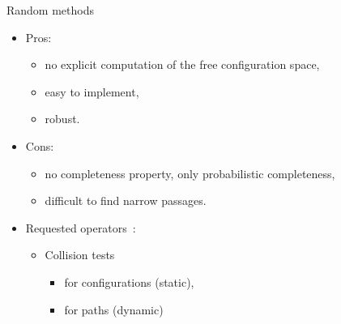 %
%

\begin{frame} {Random methods}
  \begin{itemize}
  \item Pros:
    \begin{itemize}
    \item no explicit computation of the free configuration space,
    \item easy to implement,
    \item robust.
    \end{itemize}
    \pause
  \item Cons:
    \begin{itemize}
    \item no completeness property, only probabilistic completeness,
    \item difficult to find narrow passages.
    \end{itemize}
    \pause
  \item Requested operators~:
    \begin{itemize}
    \item Collision tests
      \begin{itemize}
      \item for configurations (static),
      \item for paths (dynamic)
      \end{itemize}
    \end{itemize}
  \end{itemize}
\end{frame}
